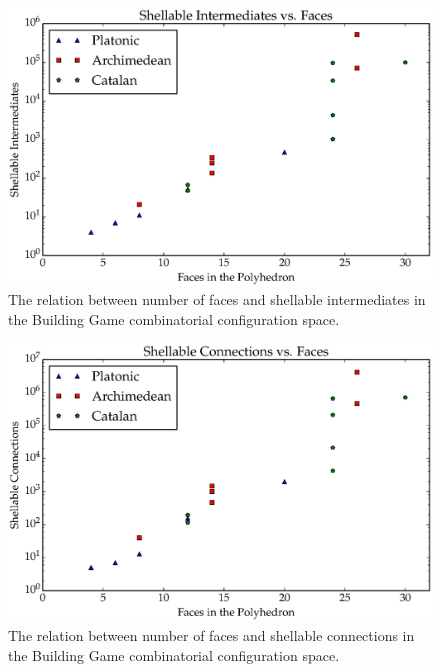 \begin{figure}[ht]
\includegraphics[scale=0.6, angle=0]{images/polys_face_shell_int.eps}
\caption{The relation between number of faces and shellable intermediates in the Building Game combinatorial configuration space.}
\label{fig:FacIntShell}
\end{figure}

\begin{figure}[ht]
\includegraphics[scale=0.6, angle=0]{images/polys_face_shell_con.eps}
\caption{The relation between number of faces and shellable connections in the Building Game combinatorial configuration space.}
\label{fig:FacConShell}
\end{figure}


